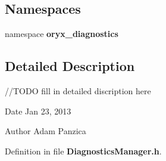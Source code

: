 \subsection*{\-Namespaces}
\begin{DoxyCompactItemize}
\item 
namespace {\bf oryx\-\_\-diagnostics}
\end{DoxyCompactItemize}


\subsection{\-Detailed \-Description}
//\-T\-O\-D\-O fill in detailed discription here \begin{DoxyDate}{\-Date}
\-Jan 23, 2013 
\end{DoxyDate}
\begin{DoxyAuthor}{\-Author}
\-Adam \-Panzica 
\end{DoxyAuthor}


\-Definition in file {\bf \-Diagnostics\-Manager.\-h}.

